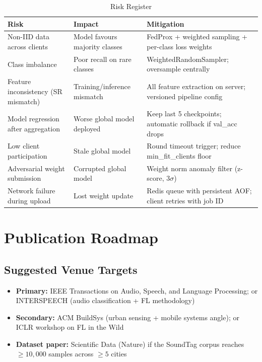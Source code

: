 \documentclass[11pt,a4paper]{article}
\begin{document}
\begin{table}[h]
\centering
\caption{Risk Register}
\begin{tabular}{@{}p{3.5cm}p{4cm}p{5cm}@{}}
\toprule
\textbf{Risk} & \textbf{Impact} & \textbf{Mitigation} \\
\midrule
Non-IID data across clients & Model favours majority classes & FedProx + weighted sampling + per-class loss weights \\
Class imbalance & Poor recall on rare classes & WeightedRandomSampler; oversample centrally \\
Feature inconsistency (SR mismatch) & Training/inference mismatch & All feature extraction on server; versioned pipeline config \\
Model regression after aggregation & Worse global model deployed & Keep last 5 checkpoints; automatic rollback if val\_acc drops \\
Low client participation & Stale global model & Round timeout trigger; reduce min\_fit\_clients floor \\
Adversarial weight submission & Corrupted global model & Weight norm anomaly filter (z-score, $3\sigma$) \\
Network failure during upload & Lost weight update & Redis queue with persistent AOF; client retries with job ID \\
\bottomrule
\end{tabular}
\end{table}

\section{Publication Roadmap}

\subsection{Suggested Venue Targets}

\begin{itemize}[leftmargin=*,noitemsep]
  \item \textbf{Primary:} IEEE Transactions on Audio, Speech, and Language Processing;
        or INTERSPEECH (audio classification + FL methodology)
  \item \textbf{Secondary:} ACM BuildSys (urban sensing + mobile systems angle);
        or ICLR workshop on FL in the Wild
  \item \textbf{Dataset paper:} Scientific Data (Nature) if the SoundTag corpus
        reaches $\geq 10{,}000$ samples across $\geq 5$ cities
\end{itemize}
\end{document}

